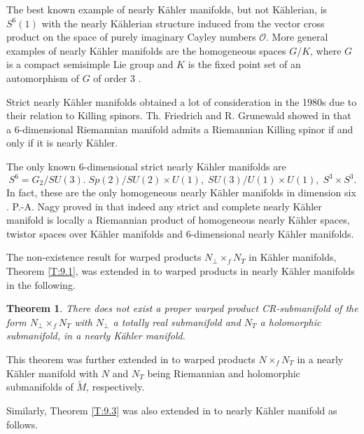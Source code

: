 \documentclass{amsart}
\theoremstyle{plain}
\newtheorem{theorem}{Theorem}[section]
\numberwithin{equation}{section}
\theoremstyle{remark}
\numberwithin{equation}{section}
\begin{document}
The best known example of nearly K\"ahler manifolds, but not K\"ahlerian, is $S^6(1)$ with the nearly K\"ahlerian structure  induced from the vector cross product on the space of purely imaginary Cayley numbers $\mathcal O$. More general examples of nearly K\"ahler manifolds are the homogeneous spaces $G/K$, where $G$ is a compact semisimple Lie group and $K$ is the fixed point set of an automorphism of $G$ of order 3 \cite{WG68}.

 Strict nearly K\"ahler manifolds obtained a lot of consideration in the 1980s due to their relation to Killing spinors.  
Th. Friedrich and R. Grunewald showed in \cite{FG} that a 6-dimensional Riemannian manifold admits a Riemannian Killing spinor if and only if it is nearly K\"ahler. 

The only known 6-dimensional strict nearly K\"ahler manifolds are
$$S^{6}=G_{2}/SU(3). \; Sp(2)/SU(2)\times U(1),\; SU(3)/U(1)\times U(1),\; S^{3}\times S^{3}.$$ In fact, these are the only homogeneous nearly K\"ahler manifolds in dimension six \cite{Bu}. P.-A.  Nagy proved in  \cite{Nagy} that indeed any strict and complete nearly K\"ahler manifold is locally a Riemannian product of homogeneous nearly K\"ahler spaces, twistor spaces over K\"ahler manifolds and 6-dimensional nearly K\"ahler manifolds. 

The non-existence result for warped products $N_{\perp}\times_{f}N_{T}$ in K\"ahler manifolds, Theorem \ref{T:9.1}, was extended in \cite{KKS07,SG08} to warped products in nearly K\"ahler manifolds in the following.

 \begin{theorem} \label{T:14.1}There does not exist a proper warped product CR-submanifold of the form $N_{\perp}\times_{f}N_{T}$ with $N_{\perp}$ a totally real submanifold and $N_{T}$ a holomorphic submanifold, in a nearly K\"ahler manifold.\end{theorem}
 
 This theorem was further extended in \cite{KK09} to warped products $N\times_{f}N_{T}$  in a nearly K\"ahler manifold with $N$ and $N_{T}$ being Riemannian and holomorphic submanifolds of $\tilde M$, respectively.
 
 
 Similarly, Theorem \ref{T:9.3}  was also extended in \cite{AAK09,KKS07,SG08} to nearly K\"ahler manifold as follows.
\end{document}
